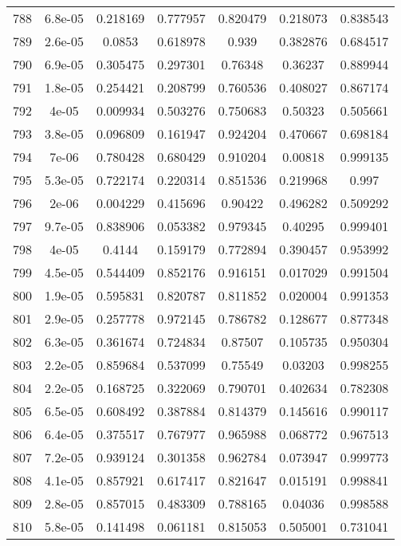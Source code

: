 \begin{table}
\begin{tabular}{c|c|c|c|c|c|c}
788 & 6.8e-05 & 0.218169 & 0.777957 & 0.820479 & 0.218073 & 0.838543\\
789 & 2.6e-05 & 0.0853 & 0.618978 & 0.939 & 0.382876 & 0.684517\\
790 & 6.9e-05 & 0.305475 & 0.297301 & 0.76348 & 0.36237 & 0.889944\\
791 & 1.8e-05 & 0.254421 & 0.208799 & 0.760536 & 0.408027 & 0.867174\\
792 & 4e-05 & 0.009934 & 0.503276 & 0.750683 & 0.50323 & 0.505661\\
793 & 3.8e-05 & 0.096809 & 0.161947 & 0.924204 & 0.470667 & 0.698184\\
794 & 7e-06 & 0.780428 & 0.680429 & 0.910204 & 0.00818 & 0.999135\\
795 & 5.3e-05 & 0.722174 & 0.220314 & 0.851536 & 0.219968 & 0.997\\
796 & 2e-06 & 0.004229 & 0.415696 & 0.90422 & 0.496282 & 0.509292\\
797 & 9.7e-05 & 0.838906 & 0.053382 & 0.979345 & 0.40295 & 0.999401\\
798 & 4e-05 & 0.4144 & 0.159179 & 0.772894 & 0.390457 & 0.953992\\
799 & 4.5e-05 & 0.544409 & 0.852176 & 0.916151 & 0.017029 & 0.991504\\
800 & 1.9e-05 & 0.595831 & 0.820787 & 0.811852 & 0.020004 & 0.991353\\
801 & 2.9e-05 & 0.257778 & 0.972145 & 0.786782 & 0.128677 & 0.877348\\
802 & 6.3e-05 & 0.361674 & 0.724834 & 0.87507 & 0.105735 & 0.950304\\
803 & 2.2e-05 & 0.859684 & 0.537099 & 0.75549 & 0.03203 & 0.998255\\
804 & 2.2e-05 & 0.168725 & 0.322069 & 0.790701 & 0.402634 & 0.782308\\
805 & 6.5e-05 & 0.608492 & 0.387884 & 0.814379 & 0.145616 & 0.990117\\
806 & 6.4e-05 & 0.375517 & 0.767977 & 0.965988 & 0.068772 & 0.967513\\
807 & 7.2e-05 & 0.939124 & 0.301358 & 0.962784 & 0.073947 & 0.999773\\
808 & 4.1e-05 & 0.857921 & 0.617417 & 0.821647 & 0.015191 & 0.998841\\
809 & 2.8e-05 & 0.857015 & 0.483309 & 0.788165 & 0.04036 & 0.998588\\
810 & 5.8e-05 & 0.141498 & 0.061181 & 0.815053 & 0.505001 & 0.731041\\
\end{tabular}
\end{table}
